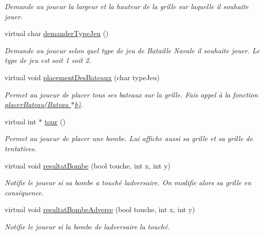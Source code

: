 \begin{DoxyCompactItemize}
\begin{DoxyCompactList}\small\item\em Demande au joueur la largeur et la hauteur de la grille sur laquelle il souhaite jouer. \end{DoxyCompactList}\item 
virtual char \hyperlink{class_joueur_humain_a06ff8df7b6d3fa366df970fd1d137a61}{demander\+Type\+Jeu} ()
\begin{DoxyCompactList}\small\item\em Demande au joueur selon quel type de jeu de Bataille Navale il souhaite jouer. Le type de jeu est soit 1 soit 2. \end{DoxyCompactList}\item 
virtual void \hyperlink{class_joueur_humain_ae27bf69ba0db87cd8268ba1cd1e4f817}{placement\+Des\+Bateaux} (char type\+Jeu)
\begin{DoxyCompactList}\small\item\em Permet au joueur de placer tous ses bateaux sur la grille. Fais appel à la fonction \hyperlink{class_joueur_humain_af9e3ccafc7cde958dda81551d0ef6abd}{placer\+Bateau(\+Bateau $\ast$b)}. \end{DoxyCompactList}\item 
virtual int $\ast$ \hyperlink{class_joueur_humain_a92f4cb99ff2957813da34fb60e211870}{tour} ()
\begin{DoxyCompactList}\small\item\em Permet au joueur de placer une bombe. Lui affiche aussi sa grille et sa grille de tentatives. \end{DoxyCompactList}\item 
virtual void \hyperlink{class_joueur_humain_a9eeae3b54b174e477a94c75d57a0d403}{resultat\+Bombe} (bool touche, int x, int y)
\begin{DoxyCompactList}\small\item\em Notifie le joueur si sa bombe a touché l\textquotesingle{}adversaire. On modifie alors sa grille en conséquence. \end{DoxyCompactList}\item 
virtual void \hyperlink{class_joueur_humain_acdd6b332153e1543d083d272fbdf8289}{resultat\+Bombe\+Adverse} (bool touche, int x, int y)
\begin{DoxyCompactList}\small\item\em Notifie le joueur si la bombe de l\textquotesingle{}adversaire l\textquotesingle{}a touché. \end{DoxyCompactList}\end{DoxyCompactItemize}
